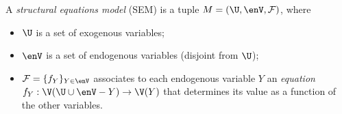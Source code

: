 \begin{defn}
        \label{defn:SEM}
    A \emph{structural equations model} (SEM) is a tuple
    $M = (\U, \enV, \mathcal F)$,
    where
    \begin{itemize}[left=0pt,itemsep=0pt,topsep=0pt,parsep=0.3ex]
    \item $\U$ is a set of exogenous variables;
    \item $\enV$ is a set of endogenous variables (disjoint from $\U$);
    \item $\mathcal F = \{ f_Y \}_{Y \in \enV}$ associates to each endogenous variable $Y$ an \emph{equation}
    $f_Y : \V (\U \cup \enV - Y) \to \V(Y)$
     that determines its value as a function of the other variables. 
        \qedhere
    \end{itemize}
\end{defn}

